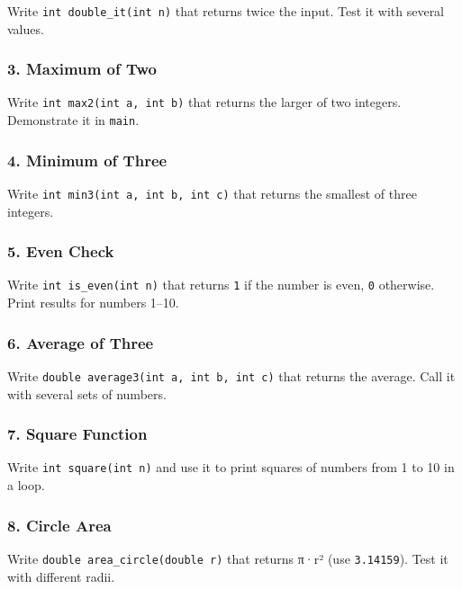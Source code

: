 \documentclass[
  letterpaper,
  DIV=11,
  numbers=noendperiod]{scrreprt}
\begin{document}
Write \texttt{int\ double\_it(int\ n)} that returns twice the input.
Test it with several values.

\subsubsection{3. Maximum of Two}\label{maximum-of-two-1}

Write \texttt{int\ max2(int\ a,\ int\ b)} that returns the larger of two
integers. Demonstrate it in \texttt{main}.

\subsubsection{4. Minimum of Three}\label{minimum-of-three}

Write \texttt{int\ min3(int\ a,\ int\ b,\ int\ c)} that returns the
smallest of three integers.

\subsubsection{5. Even Check}\label{even-check}

Write \texttt{int\ is\_even(int\ n)} that returns \texttt{1} if the
number is even, \texttt{0} otherwise. Print results for numbers 1--10.

\subsubsection{6. Average of Three}\label{average-of-three}

Write \texttt{double\ average3(int\ a,\ int\ b,\ int\ c)} that returns
the average. Call it with several sets of numbers.

\subsubsection{7. Square Function}\label{square-function}

Write \texttt{int\ square(int\ n)} and use it to print squares of
numbers from 1 to 10 in a loop.

\subsubsection{8. Circle Area}\label{circle-area}

Write \texttt{double\ area\_circle(double\ r)} that returns π·r² (use
\texttt{3.14159}). Test it with different radii.
\end{document}

